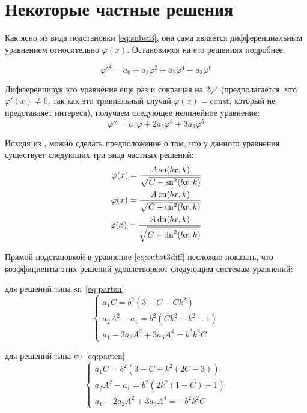 \section{Некоторые частные решения}\label{sec:part}

Как ясно из вида подстановки \eqref{eq:subst3}, она сама является дифференциальным уравнением относительно $\varphi(x)$. Остановимся на его решениях подробнее.

\begin{equation}
\varphi'^2 = a_0 + a_1\varphi^2 + a_2\varphi^4 + a_3\varphi^6
\end{equation}

Дифференцируя это уравнение еще раз и сокращая на $2\varphi'$
(предполагается, что $\varphi'(x) \ne 0$, так как это тривиальный случай $\varphi (x) = \mathrm{const}$, который не представляет интереса), получаем следующее нелинейное уравнение:
\begin{equation}
\varphi'' = a_1\varphi + 2a_2\varphi^3 + 3a_3\varphi^5
\label{eq:subst3diff}
\end{equation}

Исходя из \cite{Ishibashi1984, Kovalev1976}, можно сделать предположение о том, что у данного уравнения существует следующих три вида частных решений:
\begin{align}
\varphi(x) = \frac{A\operatorname{sn}(bx,k)}{\sqrt{C-\operatorname{sn}^2(bx,k)}}\label{eq:partsn}\\
\varphi(x) = \frac{A\operatorname{cn}(bx,k)}{\sqrt{C-\operatorname{cn}^2(bx,k)}}\label{eq:partcn}\\
\varphi(x) = \frac{A\operatorname{dn}(bx,k)}{\sqrt{C-\operatorname{dn}^2(bx,k)}}\label{eq:partdn}
\end{align}

Прямой подстановкой в уравнение \eqref{eq:subst3diff} несложно показать, что коэффициенты этих решений удовлетворяют следующим системам уравнений:

для решений типа $\operatorname{sn}$ \eqref{eq:partsn}
\begin{equation}
\begin{cases}
a_1 C = b^2 \left(3 - C - Ck^2\right) \\
a_2 A^2 - a_1 = b^2\left(Ck^2 - k^2 - 1\right)\\
a_1 - 2a_2 A^2 + 3a_3 A^4 = b^2 k^2 C
\end{cases}
\end{equation}

для решений типа $\operatorname{cn}$ \eqref{eq:partcn}
\begin{equation}
\begin{cases}
a_1 C = b^2 \left(3 - C + k^2\left(2C-3\right)\right)\\
a_2 A^2 - a_1 = b^2\left(2k^2\left(1-C\right) - 1\right)\\
a_1 - 2a_2 A^2 + 3a_3 A^4 = -b^2k^2C
\end{cases}
\end{equation}

